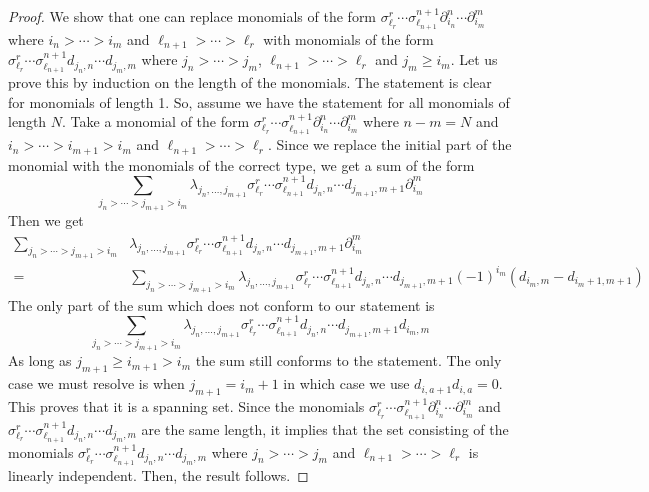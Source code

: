 \documentclass[a4paper,11pt]{amsart}
\theoremstyle{definition}
\begin{document}
\begin{proof}
  We show that one can replace monomials of the form $\sigma^r_{\ell_r}\cdots \sigma^{n+1}_{\ell_{n+1}}\partial^n_{i_n}\cdots \partial^m_{i_m}$ where $i_n>\cdots>i_m$ and $\ell_{n+1} >\cdots > \ell_r$ with monomials of the form $\sigma^r_{\ell_r}\cdots \sigma^{n+1}_{\ell_{n+1}}d_{j_n,n}\cdots d_{j_m,m}$ where $j_n>\cdots>j_m$, $\ell_{n+1} >\cdots > \ell_r$ and $j_m\geq i_m$. Let us prove this by induction on the length of the monomials. The statement is clear for monomials of length 1. So, assume we have the statement for all monomials of length $N$. Take a monomial of the form $\sigma^r_{\ell_r}\cdots \sigma^{n+1}_{\ell_{n+1}}\partial^n_{i_n}\cdots \partial^m_{i_m}$ where $n-m=N$ and $i_n>\cdots>i_{m+1}>i_m$ and $\ell_{n+1} >\cdots > \ell_r$. Since we replace the initial part of the monomial with the monomials of the correct type, we get a sum of the form
  \begin{equation}
      \sum _{j_n>\cdots>j_{m+1}>i_{m}} \lambda_{j_n,\ldots,j_{m+1}}\sigma^r_{\ell_r}\cdots \sigma^{n+1}_{\ell_{n+1}}d_{j_n,n}\cdots d_{j_{m+1},m+1}\partial^{m}_{i_{m}}
  \end{equation}
  Then we get
  \begin{align}
    \sum _{j_n>\cdots>j_{m+1}>i_{m}} & \lambda_{j_n,\ldots,j_{m+1}}\sigma^r_{\ell_r}\cdots \sigma^{n+1}_{\ell_{n+1}}d_{j_n,n}\cdots d_{j_{m+1},m+1}\partial^{m}_{i_{m}}\nonumber\\ 
    = & \sum _{j_n>\cdots>j_{m+1}>i_{m}} \lambda_{j_n,\ldots,j_{m+1}}\sigma^r_{\ell_r}\cdots \sigma^{n+1}_{\ell_{n+1}}d_{j_n,n}\cdots d_{j_{m+1},m+1}
    (-1)^{i_{m}}(d_{i_{m},m}-d_{i_{m}+1,m+1})
  \end{align}
  The only part of the sum which does not conform to our statement is
  \begin{equation}
    \sum _{j_n>\cdots>j_{m+1}>i_{m}} \lambda_{j_n,\ldots,j_{m+1}}\sigma^r_{\ell_r}\cdots \sigma^{n+1}_{\ell_{n+1}}d_{j_n,n}\cdots d_{j_{m+1},m+1} d_{i_{m},m}
  \end{equation}
  As long as $j_{m+1}\geq i_{m+1}>i_{m}$ the sum still conforms to the statement. The only case we must resolve is when $j_{m+1} = i_{m}+1$ in which case we use $d_{i,a+1}d_{i,a} = 0$. This proves that it is a spanning set. Since the monomials $\sigma^r_{\ell_r}\cdots \sigma^{n+1}_{\ell_{n+1}}\partial^n_{i_n}\cdots \partial^m_{i_m}$ and $\sigma^r_{\ell_r}\cdots \sigma^{n+1}_{\ell_{n+1}}d_{j_n,n}\cdots d_{j_m,m}$ are the same length, it implies that the set consisting of the monomials $\sigma^r_{\ell_r}\cdots \sigma^{n+1}_{\ell_{n+1}}d_{j_n,n}\cdots d_{j_m,m}$ where $j_n>\cdots>j_m$ and $\ell_{n+1} >\cdots > \ell_r$ is linearly independent. Then, the result follows.
\end{proof}
\end{document}
